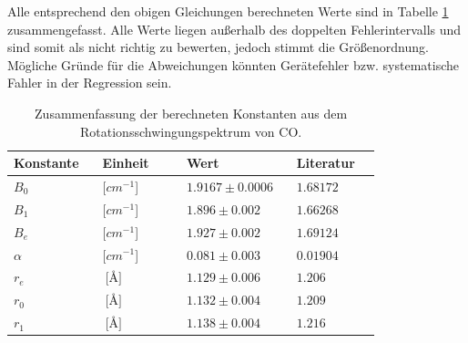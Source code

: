 Alle entsprechend den obigen Gleichungen berechneten Werte sind in Tabelle \ref{Zusammenfassung} zusammengefasst. Alle Werte liegen außerhalb des doppelten Fehlerintervalls und sind somit als nicht richtig zu bewerten, jedoch stimmt die Größenordnung. Mögliche Gründe für die Abweichungen könnten Gerätefehler bzw. systematische Fahler in der Regression sein.

\begin{table}
\label{Zusammenfassung}
	\caption{Zusammenfassung der berechneten Konstanten aus dem Rotationsschwingungspektrum von CO.  }
\begin{tabular}{C{0.2\linewidth}|C{0.2\linewidth}|C{0.2\linewidth}|C{0.2\linewidth}}
Konstante             & Einheit                  & Wert                           & Literatur \\ \hline
$B_0$                  & [$cm^{-1}$]          & $1.9167 \pm 0.0006$	& $1.68172$   \\
$B_1$                  & [$cm^{-1}$]          & $1.896 \pm 0.002$   	& $1.66268$   \\
$B_e $                 & [$cm^{-1}$]          & $1.927 \pm 0.002$   	& $1.69124$   \\
$\alpha$		& [$cm^{-1}$]       & $0.081 \pm 0.003$   	& $0.01904$   \\
$r_e$                  & $\SI{}{[\angstrom]}$		& $1.129 \pm 0.006 $  	& $1.206$     \\
$r_0$                  & $\SI{}{[\angstrom]} $		& $1.132 \pm 0.004$  	 & $1.209$     \\
$r_1$                  & $\SI{}{[\angstrom]}$ 		& $1.138 \pm 0.004$  	 & $1.216$    
\end{tabular}
\end{table}



